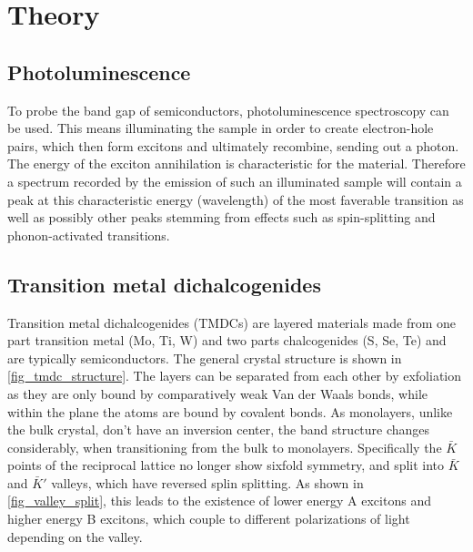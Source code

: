 \section{Theory}
\label{sec:theory}

\subsection{Photoluminescence}

To probe the band gap of semiconductors, photoluminescence spectroscopy can be used.
This means illuminating the sample in order to create electron-hole pairs, which then form excitons and ultimately recombine, sending out a photon.
The energy of the exciton annihilation is characteristic for the material.
Therefore a spectrum recorded by the emission of such an illuminated sample will contain a peak at this characteristic energy (wavelength) of the most faverable transition as well as possibly other peaks stemming from effects such as spin-splitting and phonon-activated transitions.

\subsection{Transition metal dichalcogenides}

Transition metal dichalcogenides (TMDCs) are layered materials made from one part transition metal (Mo, Ti, W) and two parts chalcogenides (S, Se, Te) and are typically semiconductors.
The general crystal structure is shown in \cref{fig_tmdc_structure}.
The layers can be separated from each other by exfoliation as they are only bound by comparatively weak Van der Waals bonds, while within the plane the atoms are bound by covalent bonds.
As monolayers, unlike the bulk crystal, don't have an inversion center, the band structure changes considerably, when transitioning from the bulk to monolayers.
Specifically the $\bar{K}$ points of the reciprocal lattice no longer show sixfold symmetry, and split into $\bar{K}$ and $\bar{K}'$ valleys, which have reversed splin splitting.
As shown in \cref{fig_valley_split}, this leads to the existence of lower energy A excitons and higher energy B excitons, which couple to different polarizations of light depending on the valley.


